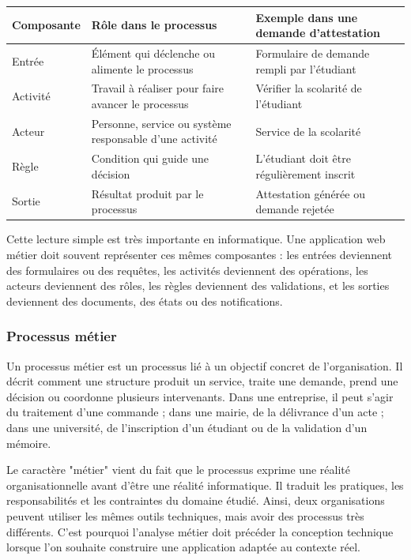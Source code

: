 \begin{center}
\begin{tabular}{|p{3.2cm}|p{5.2cm}|p{6.4cm}|}
\hline
\textbf{Composante} & \textbf{Rôle dans le processus} & \textbf{Exemple dans une demande d'attestation} \\
\hline
Entrée & Élément qui déclenche ou alimente le processus & Formulaire de demande rempli par l'étudiant \\
\hline
Activité & Travail à réaliser pour faire avancer le processus & Vérifier la scolarité de l'étudiant \\
\hline
Acteur & Personne, service ou système responsable d'une activité & Service de la scolarité \\
\hline
Règle & Condition qui guide une décision & L'étudiant doit être régulièrement inscrit \\
\hline
Sortie & Résultat produit par le processus & Attestation générée ou demande rejetée \\
\hline
\end{tabular}
\end{center}

Cette lecture simple est très importante en informatique. Une application web métier doit souvent représenter ces mêmes composantes : les entrées deviennent des formulaires ou des requêtes, les activités deviennent des opérations, les acteurs deviennent des rôles, les règles deviennent des validations, et les sorties deviennent des documents, des états ou des notifications.

\subsubsection{Processus métier}

Un processus métier est un processus lié à un objectif concret de l'organisation. Il décrit comment une structure produit un service, traite une demande, prend une décision ou coordonne plusieurs intervenants. Dans une entreprise, il peut s'agir du traitement d'une commande ; dans une mairie, de la délivrance d'un acte ; dans une université, de l'inscription d'un étudiant ou de la validation d'un mémoire.

Le caractère "métier" vient du fait que le processus exprime une réalité organisationnelle avant d'être une réalité informatique. Il traduit les pratiques, les responsabilités et les contraintes du domaine étudié. Ainsi, deux organisations peuvent utiliser les mêmes outils techniques, mais avoir des processus très différents. C'est pourquoi l'analyse métier doit précéder la conception technique lorsque l'on souhaite construire une application adaptée au contexte réel.

